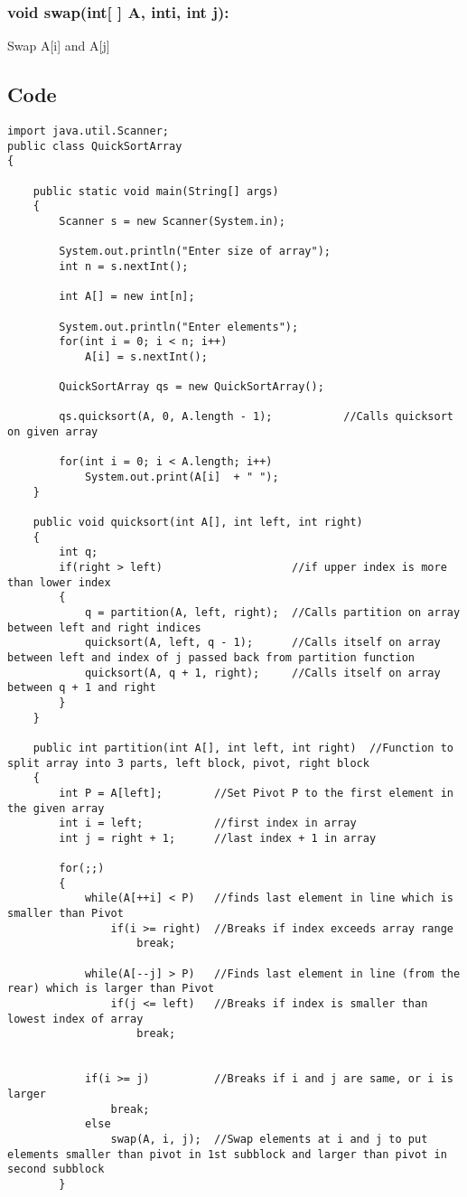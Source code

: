 \documentclass[ProgramminAssignment.tex]{subfiles}
\begin{document}
\subsubsection*{void swap(int[ ] A, inti, int j):}
	Swap A[i] and A[j]


\subsection{Code}
\begin{lstlisting}
import java.util.Scanner;
public class QuickSortArray
{

	public static void main(String[] args)
	{
		Scanner s = new Scanner(System.in);
		
		System.out.println("Enter size of array");
		int n = s.nextInt();
		
		int A[] = new int[n];
		
		System.out.println("Enter elements");
		for(int i = 0; i < n; i++)
			A[i] = s.nextInt();
		
		QuickSortArray qs = new QuickSortArray();
		
		qs.quicksort(A, 0, A.length - 1);			//Calls quicksort on given array
		
		for(int i = 0; i < A.length; i++)
			System.out.print(A[i]  + " ");
	}

	public void quicksort(int A[], int left, int right)
	{
		int q;
		if(right > left)					//if upper index is more than lower index
		{
			q = partition(A, left, right);	//Calls partition on array between left and right indices
			quicksort(A, left, q - 1);		//Calls itself on array between left and index of j passed back from partition function
			quicksort(A, q + 1, right);		//Calls itself on array between q + 1 and right
		}
	}
	
	public int partition(int A[], int left, int right)	//Function to split array into 3 parts, left block, pivot, right block
	{
		int P = A[left];		//Set Pivot P to the first element in the given array
		int i = left;			//first index in array
		int j = right + 1;		//last index + 1 in array
		
		for(;;)
		{
			while(A[++i] < P)	//finds last element in line which is smaller than Pivot
				if(i >= right)	//Breaks if index exceeds array range
					break;
			
			while(A[--j] > P)	//Finds last element in line (from the rear) which is larger than Pivot
				if(j <= left)	//Breaks if index is smaller than lowest index of array
					break;
			
			
			if(i >= j)			//Breaks if i and j are same, or i is larger
				break;
			else
				swap(A, i, j);	//Swap elements at i and j to put elements smaller than pivot in 1st subblock and larger than pivot in second subblock
		}
		

\end{lstlisting}
\end{document}
